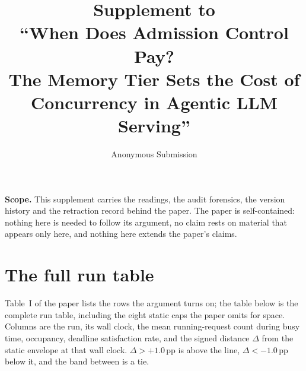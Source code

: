 \documentclass[10pt]{article}
\title{Supplement to\\``When Does Admission Control Pay?\\The Memory Tier Sets the Cost of Concurrency in Agentic LLM Serving''}
\author{Anonymous Submission}
\date{}
\begin{document}
\maketitle
\noindent\textbf{Scope.} This supplement carries the readings, the audit forensics,
the version history and the retraction record behind the paper. The paper is
self-contained: nothing here is needed to follow its argument, no claim rests on
material that appears only here, and nothing here extends the paper's claims.
\medskip
\section{The full run table}

Table~I of the paper lists the rows the argument turns on; the table
below is the complete run table, including the eight static caps the paper omits
for space. Columns are the run, its wall clock, the mean running-request count
during busy time, occupancy, deadline satisfaction rate, and the signed distance
$\Delta$ from the static envelope at that wall clock. $\Delta>+1.0$\,pp is above
the line, $\Delta<-1.0$\,pp below it, and the band between is a tie.
\end{document}

